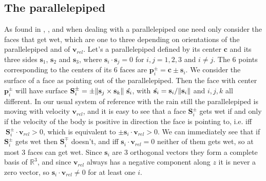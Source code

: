 \documentclass[a4paper,12pt]{article}
\begin{document}
\subsection{The parallelepiped}
As found in \cite{Deakin}, \cite{Hailman}, \cite{Bocci} and \cite{Kroetz} when dealing with a parallelepiped one need only consider the faces that get wet, which are one to three depending on orientations of the parallelepiped and of $\mathbf{v}_{rel}$. Let's a parallelepiped defined by its center $\mathbf{c}$ and its three sides $\mathbf{s}_1$, $\mathbf{s}_2$ and $\mathbf{s}_3$, where $\mathbf{s}_i \cdot \mathbf{s}_j = 0$ for $i,j = 1, 2, 3$ and $i \neq j$. The 6 points corresponding to the centers of its 6 faces are $\mathbf{p}_i^\pm = \mathbf{c} \pm \mathbf{s}_i$. We consider the surface of a face as pointing out of the parallelepiped. Then the face with center $\mathbf{p}_i^\pm$ will have surface $\mathbf{S}_i^\pm = \pm \norm{\mathbf{s}_j \times \mathbf{s}_k} \ \hat{\mathbf{s}_i}$, with $\hat{\mathbf{s}_i} = \mathbf{s}_i/\norm{\mathbf{s}_i}$ and $i, j, k$ all different. In our usual system of reference with the rain still the parallelepiped is moving with velocity $\mathbf{v}_{rel}$, and it is easy to see that a face $\mathbf{S}_i^\pm$ gets wet if and only if the velocity of the body is positive in direction the face is pointing to, i.e. iff $\ \mathbf{S}_i^\pm \cdot \mathbf{v}_{rel} > 0$, which is equivalent to $\pm \mathbf{s}_i \cdot \mathbf{v}_{rel} > 0$. We can immediately see that if $\mathbf{S}_i^\pm$ gets wet then $\mathbf{S}_i^\mp$ doesn't, and iff $\mathbf{s}_i \cdot \mathbf{v}_{rel} = 0$ neither of them gets wet, so at most 3 faces can get wet. Since $\mathbf{s}_i$ are 3 orthogonal vectors they form a complete basis of $\mathbb{R}^3$, and since $\mathbf{v}_{rel}$ always has a negative component along $z$ it is never a zero vector, so $\mathbf{s}_i \cdot \mathbf{v}_{rel} \neq 0$ for at least one $i$.
\end{document}
